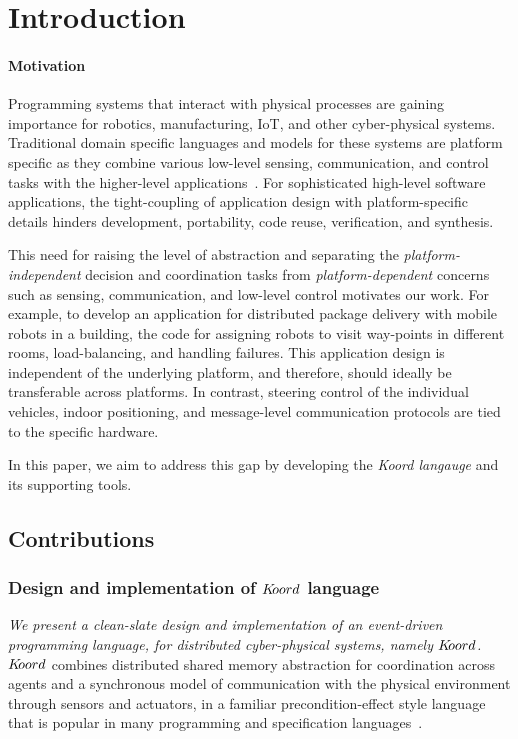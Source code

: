 \section{Introduction}
\label{sec:intro}

\paragraph{Motivation}
Programming systems that interact with physical processes are gaining importance for robotics, manufacturing, IoT, and other cyber-physical systems. Traditional domain specific languages and models for these systems are platform specific as they combine various low-level sensing, communication, and control tasks with the higher-level applications~\cite{nordmann2014robotics}. For sophisticated high-level software applications, the tight-coupling of application design with platform-specific details hinders development, portability, code reuse,  verification, and synthesis.

This need for raising the level of abstraction and separating the \emph{platform-independent} decision and coordination tasks from \emph{platform-dependent} concerns such as sensing, communication, and low-level control motivates our work. For example, to develop an application for distributed package delivery with mobile robots in a building, the code for assigning robots to visit way-points in different rooms, load-balancing, and handling failures.  This application design is independent of the underlying platform, and therefore, should ideally be transferable across platforms. In contrast, steering control of the individual vehicles, indoor positioning, and message-level communication protocols are tied to the specific hardware.


In this paper, we aim to address this gap by developing the {\em Koord langauge} and its supporting tools. 


%
%
\subsection{Contributions}
\subsubsection{Design and implementation of $K\kern-2pt oord$ language}
{\em We present a clean-slate design and implementation of an event-driven programming language, for distributed cyber-physical systems, namely $K\kern-2pt oord$.} 
%
$K\kern-2pt oord$ combines distributed shared memory abstraction for coordination across agents and a synchronous model of communication with the physical environment through sensors and actuators, in a familiar precondition-effect style language that is popular in many programming and specification languages~\cite{IOAManual,Promela,Charon}.
%

